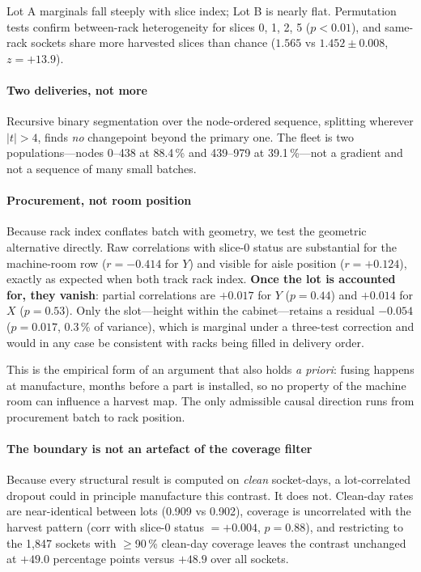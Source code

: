 \documentclass[10pt,conference]{IEEEtran}
\begin{document}
Lot A marginals fall steeply with slice index; Lot B is nearly flat. Permutation tests confirm
between-rack heterogeneity for slices 0, 1, 2, 5 ($p<0.01$), and same-rack sockets share more
harvested slices than chance ($1.565$ vs $1.452\pm0.008$, $z=+13.9$).

\paragraph*{Two deliveries, not more} Recursive binary segmentation over the node-ordered
sequence, splitting wherever $|t|>4$, finds \emph{no} changepoint beyond the primary one. The
fleet is two populations---nodes 0--438 at 88.4\,\% and 439--979 at 39.1\,\%---not a gradient and
not a sequence of many small batches.

\paragraph*{Procurement, not room position} \label{par:geom} Because rack index conflates batch
with geometry, we test the geometric alternative directly. Raw correlations with slice-0 status are
substantial for the machine-room row ($r=-0.414$ for $Y$) and visible for aisle position
($r=+0.124$), exactly as expected when both track rack index. \textbf{Once the lot is accounted
for, they vanish}: partial correlations are $+0.017$ for $Y$ ($p=0.44$) and $+0.014$ for $X$
($p=0.53$). Only the slot---height within the cabinet---retains a residual $-0.054$ ($p=0.017$,
0.3\,\% of variance), which is marginal under a three-test correction and would in any case be
consistent with racks being filled in delivery order.

This is the empirical form of an argument that also holds \emph{a priori}: fusing happens at
manufacture, months before a part is installed, so no property of the machine room can influence a
harvest map. The only admissible causal direction runs from procurement batch to rack position.

\paragraph*{The boundary is not an artefact of the coverage filter} Because every structural
result is computed on \emph{clean} socket-days, a lot-correlated dropout could in principle
manufacture this contrast. It does not. Clean-day rates are near-identical between lots (0.909 vs
0.902), coverage is uncorrelated with the harvest pattern (corr with slice-0 status $=+0.004$,
$p=0.88$), and restricting to the 1{,}847 sockets with $\ge$90\,\% clean-day coverage leaves the
contrast unchanged at $+49.0$ percentage points versus $+48.9$ over all sockets.
\end{document}
